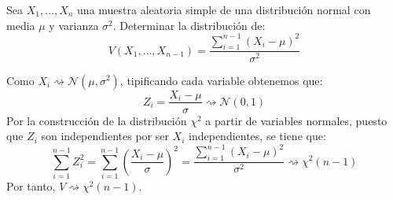 \documentclass[12pt]{article}
\begin{document}
    \newpage
    \setcounter{ejercicio}{0} %
    \begin{ejercicio}
        Sea $X_1, \dots, X_n$ una muestra aleatoria simple de una distribución normal con media $\mu$ y varianza $\sigma^2$. Determinar la distribución de:
        \[
            V(X_1, \dots, X_{n-1}) = \frac{\sum\limits_{i=1}^{n-1} (X_i - \mu)^2}{\sigma^2}
        \]

        Como $X_i \rightsquigarrow \mathcal{N}(\mu, \sigma^2)$, tipificando cada variable obtenemos que:
        \[
            Z_i = \frac{X_i - \mu}{\sigma} \rightsquigarrow \mathcal{N}(0, 1)
        \]
        Por la construcción de la distribución $\chi^2$ a partir de variables normales, puesto que $Z_i$ son independientes por ser $X_i$ independientes, se tiene que:
        \[
            \sum\limits_{i=1}^{n-1} Z_i^2 = \sum\limits_{i=1}^{n-1} \left(\frac{X_i - \mu}{\sigma}\right)^2 = \frac{\sum\limits_{i=1}^{n-1} (X_i - \mu)^2}{\sigma^2} \rightsquigarrow \chi^2(n-1)
        \]
        Por tanto, $V\rightsquigarrow \chi^2(n-1)$.
    \end{ejercicio}
\end{document}
